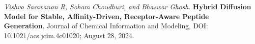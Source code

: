 \noindent
\textit{\underline{Vishva Saravanan R}, Soham Choudhuri, and Bhaswar Ghosh.} \textbf{Hybrid Diffusion Model for Stable, Affinity-Driven, Receptor-Aware Peptide Generation}. Journal of Chemical Information and Modeling, DOI: 10.1021/acs.jcim.4c01020; August 28, 2024.
